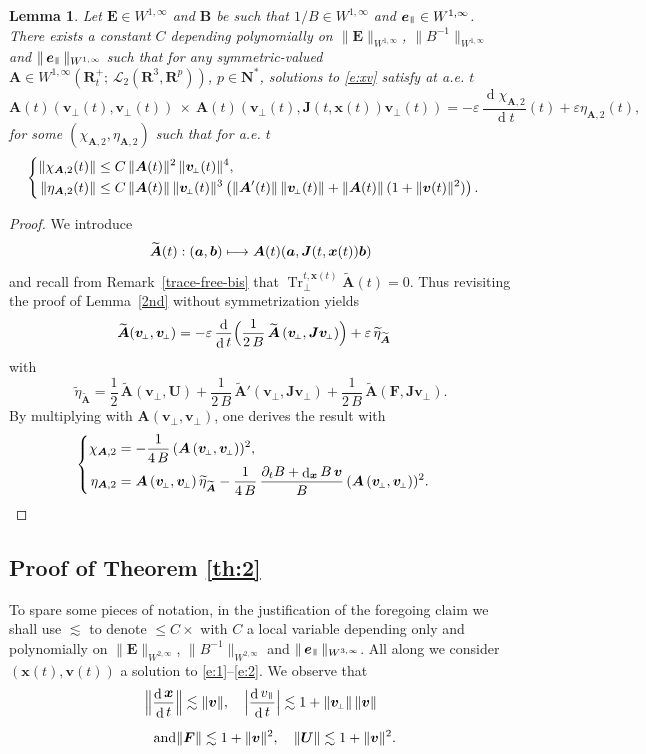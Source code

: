 \documentclass[JEP,XML,SOM,Unicode]{cedram}
\let\mathcal\mathscr
\newenvironment{splitcases}
{\begin{cases}\begin{aligned}}
{\end{aligned}\end{cases}}
\newcommand\mto{\mathchoice{\longmapsto}{\mapsto}{\mapsto}{\mapsto}}
\newcommand{\sperp}{{\scriptscriptstyle\perp}}
\let\eps\varepsilon
\let\d\partial
\DeclareMathOperator\dD{d}\let\dd\dD
\DeclareMathOperator{\Tr}{Tr}
\theoremstyle{plain}
\newtheorem{lemma}[theorem]{Lemma}
\theoremstyle{definition}
\newcommand{\bl}{\begin{lemma}}
\newcommand{\el}{\end{lemma}}
\newcommand\R{\mathbf R}
\newcommand{\N}{\mathbf N}
\newcommand\bA{{\boldsymbol A}}
\newcommand\bB{{\boldsymbol B}}
\newcommand\bE{{\boldsymbol E}}
\newcommand\bF{{\boldsymbol F}}
\newcommand\bJ{{\boldsymbol J}}
\newcommand\bU{{\boldsymbol U}}
\newcommand\bfa{{\boldsymbol a}}
\newcommand\bfb{{\boldsymbol b}}
\newcommand\bfv{{\boldsymbol v}}
\newcommand\bfx{{\boldsymbol x}}
\newcommand\cL{{\mathcal L}}
\newcommand\teta{{\widetilde \eta}}
\newcommand\tbA{\widetilde{\bA}}
\DeclareMathOperator{\beD}{\boldsymbol{e}}
\newcommand\eDpar{\beD_\mypar}
\newcommand\vpar{v_\mypar}
\newcommand\bvperp{\bfv_{\!\sperp}}
\newcommand{\Trperp}[1]{\Tr_\sperp^{#1}}
\newcommand{\mypar}{{\mkern3mu\vphantom{\perp}\vrule depth 0pt\mkern2mu\vrule depth 0pt\mkern3mu}}
\begin{document}
\bl
\label{4th-specific}
Let $\bE\in W^{1,\infty}$ and $\bB$ be such that $1/B\in W^{1,\infty}$ and $\eDpar\in W^{1,\infty}$. There exists a constant $C$ depending polynomially on $\|\bE\|_{W^{1,\infty}}$, $\|B^{-1}\|_{W^{1,\infty}}$ and $\|\eDpar\|_{W^{1,\infty}}$ such that for any symmetric-valued $\bA\in W^{1,\infty}\left(\R^+_t;\,\cL_2(\R^3,\R^p)\right)$, $p\in\N^*$, solutions to \eqref{e:xv} satisfy at a.e. $t$
\[
\bA(t)(\bvperp(t),\bvperp(t))
\ \times\ \bA(t)(\bvperp(t),\bJ(t,\bfx(t))\bvperp(t))
=-\eps\,\frac{\dD\chi_{\bA,2}}{\dD t}(t)+\eps\eta_{\bA,2}(t),
\]
for some $(\chi_{\bA,2},\eta_{\bA,2})$ such that for a.e. $t$
\[
\begin{splitcases}
\|\chi_{\bA,2}(t)\| &\leq C\,\|\bA(t)\|^2\,\|\bvperp(t)\|^4,
\\
\|\eta_{\bA,2}(t)\| &\leq C\,\|\bA(t)\|\,\|\bvperp(t)\|^3\left(\|\bA'(t)\|\,\|\bvperp(t)\|
+\|\bA(t)\|\,(1+\|\bfv(t)\|^2)\right).
\end{splitcases}
\]
\el
\begin{proof}
We introduce
\[
\tbA(t):(\bfa,\bfb)\mto \bA(t)(\bfa,\bJ(t,\bfx(t))\bfb)
\]
and recall from Remark~\ref{trace-free-bis} that $\Trperp{t,\bfx(t)}\tbA(t)=0$. Thus revisiting the proof of Lemma~\ref{2nd} without symmetrization yields
\begin{align*}
\tbA(\bvperp,\bvperp)
&=-\eps\,\frac{\dD}{\dD t}\Bigl(\frac{1}{2\,B}\,\tbA\left(\bvperp,\bJ\bvperp\right)\Bigr)+\eps\,\teta_{\tbA}
\end{align*}
with
\[
\teta_{\tbA}=\frac12\,\tbA(\bvperp,\bU)
+\frac{1}{2\,B}\,\tbA'\left(\bvperp,\bJ\bvperp\right)
+\frac{1}{2\,B}\,\tbA\left(\bF,\bJ\bvperp\right).
\]
By multiplying with $\bA(\bvperp,\bvperp)$, one derives the result with
\[
\begin{splitcases}
\chi_{\bA,2}&=-\frac{1}{4\,B}\,(\bA\left(\bvperp,\bvperp\right))^2,
\\
\eta_{\bA,2}&=\bA\left(\bvperp,\bvperp\right)\teta_{\tbA}
-\frac{1}{4\,B}\,\frac{\d_tB+\dD_\bfx B\,\bfv}{B}\,(\bA\left(\bvperp,\bvperp\right))^2.
\end{splitcases}
\]
\end{proof}

\subsection{Proof of Theorem \ref{th:2}}
\label{sec:proofTh2}

To spare some pieces of notation, in the justification of the foregoing claim we shall use $\lesssim$ to denote $\leq C\times$ with $C$ a local variable depending only and polynomially on $\|\bE\|_{W^{2,\infty}}$, $\|B^{-1}\|_{W^{2,\infty}}$ and $\|\eDpar\|_{W^{3,\infty}}$. All along we consider $(\bfx(t),\bfv(t))$ a solution to \eqref{e:1}--\eqref{e:2}. We observe that
\begin{gather*}
\Bigl\|\frac{\dD\bfx}{\dD t}\Bigr\|\lesssim \|\bfv\|,\quad
\Bigl|\frac{\dD\vpar}{\dD t}\Bigr| \lesssim 1+\|\bvperp\|\,\|\bfv\|\\[5pt]
\tag*{and}
\|\bF\|\lesssim 1+\|\bfv\|^2,\quad
\|\bU\|\lesssim 1+\|\bfv\|^2.
\end{gather*}
\end{document}
